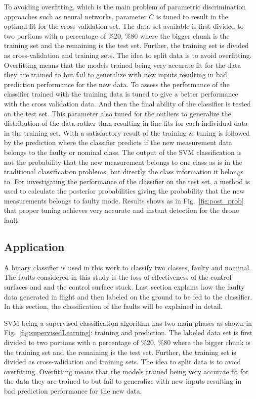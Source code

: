 To avoiding overfitting, which is the main problem of parametric discrimination approaches such as neural networks, parameter $C$ is tuned to result in the optimal fit for the cross validation set. The data set available is first divided to two portions with a percentage of \%20, \%80 where the bigger chunk is the training set and the remaining is the test set. Further, the training set is divided as cross-validation and training sets. The idea to split data is to avoid overfitting. Overfitting means that the models trained being very accurate fit for the data they are trained to but fail to generalize with new inputs resulting in bad prediction performance for the new data. To assess the performance of the classifier trained with the training data is tuned to give a better performance with the cross validation data. And then the final ability of the classifier is tested on the test set. This parameter also tuned for the outliers to generalize the distribution of the data rather than resulting in fine fits for each individual data in the training set. 
With a satisfactory result of the training \& tuning is followed by the prediction where the classifier predicts if the new measurement data belongs to the faulty or nominal class. The output of the SVM classification is not the probability that the new measurement belongs to one class as is in the traditional classification problems, but directly the class information it belongs to. For investigating the performance of the classifier on the test set, a method \cite{platt1999probabilistic} is used to calculate the posterior probabilities giving the probability that the new measurements belongs to faulty mode. Results shows as in  Fig.~\ref{fig:post_prob} that proper tuning achieves very accurate and instant detection for the drone fault.
 
\subsection{Application}

A binary classifier is used in this work to classify two classes, faulty and nominal. 
The faults considered in this study is the loss of effectiveness of the control surfaces and and the control surface stuck. 
Last section explains how the faulty data generated in flight and then labeled on the ground to be fed to the classifier. 
In this section, the classification of the faults will be explained in detail. 

SVM being a supervised classification algorithm has two main phases as shown in Fig.~\ref{fig:supervisedLearning}: training and prediction. 
The labeled data set is first divided to two portions with a percentage of \%20, \%80 where the bigger chunk is the training set and the remaining is the test set. 
Further, the training set is divided as cross-validation and training sets. The idea to split data is to avoid overfitting. 
Overfitting means that the models trained being very accurate fit for the data they are trained to but fail to generalize with new inputs resulting in bad prediction performance for the new data. 

